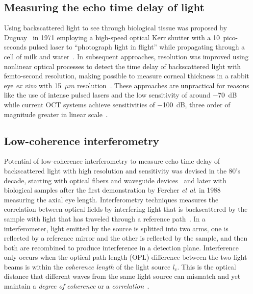 \subsection{Measuring the echo time delay of light}

Using backscattered light to see through biological tissue was proposed by Duguay~\cite{Duguay1971_Light, Duguay1971_Ultrahigh} in 1971 employing a high-speed optical Kerr shutter with a 10~pico-seconds pulsed laser to ``photograph light in flight'' while propagating through a cell of milk and water~\cite{Duguay1971_Ultrahigh}. In subsequent approaches, resolution was improved using nonlinear optical processes to detect the time delay of backscattered light with femto-second resolution, making possible to measure corneal thickness in a rabbit eye \textit{ex vivo} with 15~$\mu m$ resolution~\cite{Fujimoto1986_Femtosecond}. These approaches are unpractical for reasons like the use of intense pulsed lasers and the low  sensitivity of around $-$70~dB while current OCT systems achieve sensitivities of $-$100~dB, three order of magnitude greater in linear scale~\cite{Fujimoto2015_Introduction}.

\subsection{Low-coherence interferometry}

Potential of low-coherence interferometry to measure echo time delay of backscattered light with high resolution and sensitivity was devised in the 80's decade, starting with optical fibers and waveguide devices~\cite{Takada1987_New, Youngquist1987_Optical} and later with biological samples after the first demonstration by Fercher \textit{et al}. in 1988~\cite{Fercher1988_Eyelength} measuring the axial eye length. Interferometry techniques measures the correlation between optical fields by interfering light that is backscattered by the sample with light that has traveled through a reference path~\cite{Malacara2007_Optical}. In a interferometer, light emitted by the source is splitted into two arms, one is reflected by a reference mirror and the other is reflected by the sample, and then both are recombined to produce interference in a detection plane. Interference only occurs when the optical path length (OPL) difference between the two light beams is within the \textit{coherence length} of the light source $l_c$. This is the optical distance that different waves from the same light source can mismatch and yet maintain a \textit{degree of coherence} or a \textit{correlation}~\cite{Hecht2017_Optics}. %

